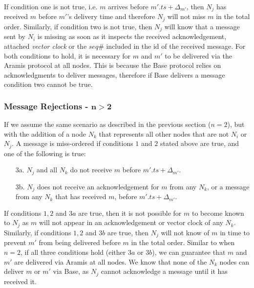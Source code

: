         If condition one is not true, i.e. $m$ arrives before $m'.ts + \Delta_{m'}$, then $N_j$ has received $m$ before $m'$'s delivery time and therefore $N_j$ will not miss $m$ in the total order.  Similarly, if condition two is not true, then $N_j$ will know that a message sent by $N_i$ is missing as soon as it inspects the received acknowledgement, attached \emph{vector clock} or the $seq\#$ included in the id of the received message.  For both conditions to hold, it is necessary for $m$ and $m'$ to be delivered via the \textsf{Aramis} protocol at all nodes.  This is because the \textsf{Base} protocol relies on acknowledgments to deliver messages, therefore if \textsf{Base} delivers a message condition two cannot be true.  
        
                \subsubsection*{Message Rejections - $\boldsymbol{n > 2}$}
        If we assume the same scenario as described in the previous section ($n=2$), but with the addition of a node $N_k$ that represents all other nodes that are not $N_i$ or $N_j$.  A message is miss-ordered if conditions $1$ and $2$ stated above are true, and one of the following is true:
        
        \begin{itemize}
            \item[3a.] $N_j$ and all $N_k$ do not receive $m$ before $m'.ts + \Delta_{m'}$.
            
            \item[3b.] $N_j$ does not receive an acknowledgement for $m$ from any $N_k$, or a message from any $N_k$ that has received $m$, before $m'.ts + \Delta_{m'}$.  
        \end{itemize}
        
        If conditions $1,2$ and $3a$ are true, then it is not possible for $m$ to become known to $N_j$ as $m$ will not appear in an acknowledgement or vector clock of any $N_k$.  Similarly, if conditions $1,2$ and $3b$ are true, then $N_j$ will not know of $m$ in time to prevent $m'$ from being delivered before $m$ in the total order.  Similar to when $n=2$, if all three conditions hold (either $3a$ or $3b$), we can guarantee that $m$ and $m'$ are delivered via \textsf{Aramis} at all nodes.  We know that none of the $N_k$ nodes can deliver $m$ or $m'$ via \textsf{Base}, as $N_j$ cannot acknowledge a message until it has received it.  
        
